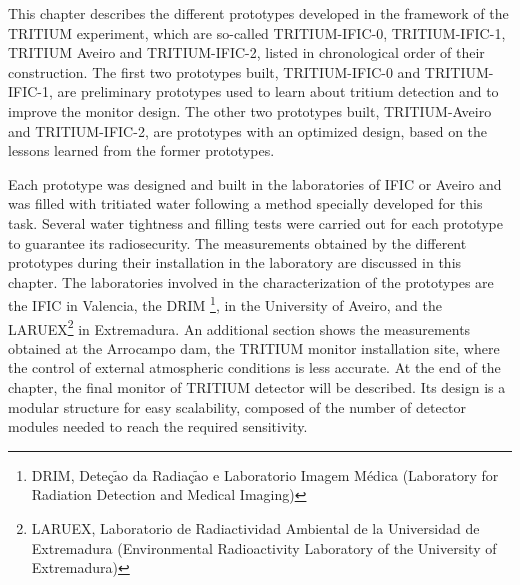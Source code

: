 This chapter describes the different prototypes developed in the framework of the TRITIUM experiment, which are so-called TRITIUM-IFIC-0, TRITIUM-IFIC-1, TRITIUM Aveiro and TRITIUM-IFIC-2, listed in chronological order of their construction. The first two prototypes built, TRITIUM-IFIC-0 and TRITIUM-IFIC-1, are preliminary prototypes used to learn about tritium detection and to improve the monitor design. The other two prototypes built, TRITIUM-Aveiro and TRITIUM-IFIC-2, are prototypes with an optimized design, based on the lessons learned from the former prototypes.

Each prototype was designed and built in the laboratories of IFIC or Aveiro and was filled with tritiated water following a method specially developed for this task. Several water tightness and filling tests were carried out for each prototype to guarantee its radiosecurity. The measurements obtained by the different prototypes during their installation in the laboratory are discussed in this chapter. The laboratories involved in the characterization of the prototypes are the IFIC in Valencia, the DRIM \footnote{DRIM, Deteç$\tilde{\text{a}}$o da Radiaç$\tilde{\text{a}}$o e Laboratorio Imagem Médica (Laboratory for Radiation Detection and Medical Imaging)}, in the University of Aveiro, and the LARUEX\footnote{LARUEX, Laboratorio de Radiactividad Ambiental de la Universidad de Extremadura (Environmental Radioactivity Laboratory of the University of Extremadura)} in Extremadura. An additional section shows the measurements obtained at the Arrocampo dam, the TRITIUM monitor installation site, where the control of external atmospheric conditions is less accurate. At the end of the chapter, the final monitor of TRITIUM detector will be described. Its design is a modular structure for easy scalability, composed of the number of detector modules needed to reach the required sensitivity.
